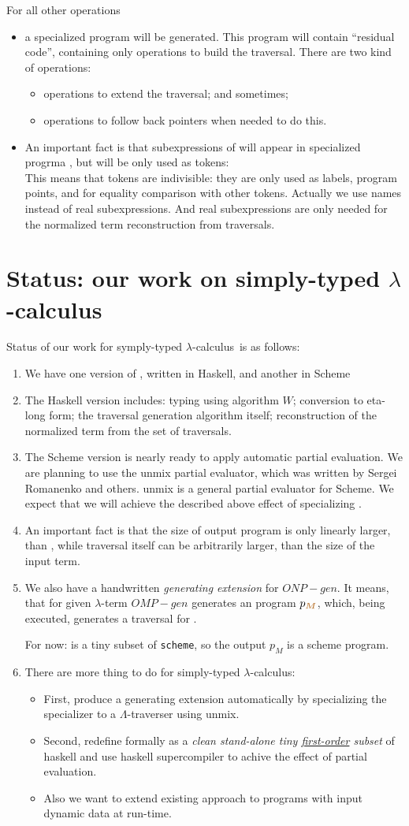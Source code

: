 \documentclass[a4paper, 10pt]{article}
\newcommand{\bi}{\begin{itemize}}
\newcommand{\ei}{\end{itemize}}
\newcommand{\be}{\begin{enumerate}}
\newcommand{\ee}{\end{enumerate}}
\newcommand{\ii}{\item}
\newcommand{\red}[1]{{\color{red}#1}}
\newcommand{\green}[1]{{\color{blue!20!black!30!green}#1}}
\newcommand{\blue}[1]{{\color{blue}#1}}
\newcommand{\lam}[1]{{\color{brown}\emph{\boldmath{#1}}}}
\newcommand{\lc}{$\lambda$-calculus}
\begin{document}
For all other operations
\bi
\ii a specialized program \lam{ONP$_M$} will be generated. This program will 
  contain ``residual code'', containing only operations to build the 
  traversal. There are two kind of operations:
  \bi
  \ii operations to extend the traversal; and sometimes;
  \ii operations to follow back pointers when needed to do this.
  \ei
\ii An important fact is that subexpressions of \lam{$M$} will appear in 
  specialized progrma \lam{ONP$_M$}, but will be only used as \red{tokens}:\\
  This means that tokens are \green{indivisible}: they are only used as 
  labels, program points, and for equality comparison with other tokens. 
  Actually we use names instead of real subexpressions. And real 
  subexpressions are only needed for the normalized term reconstruction from 
  traversals.
\ei


\section{Status: our work on simply-typed \lc}

Status of our work for symply-typed \lc \ is as follows:

\be
\ii We have one version of \lam{ONP}, written in \blue{\sc Haskell}, and 
  another in \blue{\sc Scheme}
\ii The {\sc Haskell} version includes: \green{typing} using algorithm $W$;
  \green{conversion to eta-long form; 
  the traversal generation algorithm itself; reconstruction of the normalized 
  term from the set of traversals}.
\ii The {\sc Scheme} version is nearly ready to apply automatic partial 
  evaluation. We are planning to use  the \blue{\sc unmix} partial evaluator, 
  which was written by Sergei Romanenko and others. 
  {\sc unmix} is a general partial evaluator for {\sc Scheme}. We expect that 
  we will achieve the described above effect of specializing \lam{ONP}.
\ii An important fact is that the size of output \lam{LLL} program is only 
  \red{linearly larger}, than \lam{$M$}, while traversal itself can be 
  arbitrarily larger, than the size of the input term.
\ii We also have a handwritten \red{\em generating extension} for \lam{ONP}
  $ONP-gen$. It means, that for given $\lambda$-term \lam{$M$} $OMP-gen$ 
  generates an \lam{LLL} program $p_{\lam{$M$}}$, which, being executed, 
  generates a traversal for \lam{$M$}.

  \green{For now: \lam{LLL} is a tiny subset of {\tt scheme}, so the output 
  $p_M$ is a {\sc scheme} program}.
\ii There are more thing to do for simply-typed \lc:
  \bi
  \ii First, produce a generating extension \green{automatically} by 
    \blue{specializing the specializer to a $\Lambda$-traverser} using 
    {\sc unmix}.
  \ii Second, redefine \lam{LLL} formally as a \emph{clean stand-alone tiny 
    \underline{first-order} subset} of {\sc haskell}
    and use haskell supercompiler to achive the effect of partial evaluation.
  \ii Also we want to extend existing approach to \green{programs with input 
    \red{dynamic} data} at run-time.
  \ei
\ee
\end{document}
